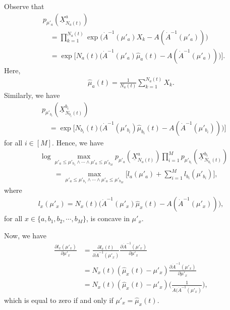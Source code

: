 \documentclass[final]{IEEEtran}
\newcommand{\nn}{\nonumber}
\begin{document}
Observe that
\begin{align}
&p_{\mu'_a}(\underline{X}_{N_a(t)}^a)\nn\\
&\quad =\prod_{k=1}^{N_a(t)} \exp\bigg(\dot{A}^{-1}(\mu'_a)X_k-A(\dot{A}^{-1}(\mu'_a) )\bigg)\\
&\quad =\exp\bigg[N_a(t)\bigg(\dot{A}^{-1}(\mu'_a)\hat{\mu}_a(t)-A(\dot{A}^{-1}(\mu'_a))\bigg)\bigg].
\end{align}
Here,
\begin{align}
\hat{\mu}_a(t)=\frac{1}{N_a(t)} \sum_{k=1}^{N_a(t)} X_k. 
\end{align}
Similarly, we have
\begin{align}
&p_{\mu'_{b_i}}(\underline{X}_{N_{b_i}(t)}^{b_i})\nn\\
&\quad =\exp\bigg[N_{b_i}(t)\bigg(\dot{A}^{-1}(\mu'_{b_i})\hat{\mu}_{b_i}(t)-A(\dot{A}^{-1}(\mu'_{b_i}))\bigg)\bigg]
\end{align} for all $i \in [M]$.
Hence, we have
\begin{align}
&\log \max_{\mu'_a\leq \mu'_{b_1} \wedge \cdots \wedge \mu'_a \leq \mu'_{b_M} }p_{\mu'_a}(\underline{X}_{N_a(t)}^a)  \prod_{i=1}^M p_{\mu'_{b_i}}(\underline{X}_{N_{b_i}(t)}^{b_i}) \nn\\
&\qquad =\max_{\mu'_a\leq \mu'_{b_1} \wedge \cdots \wedge \mu'_a \leq \mu'_{b_M} }\bigg[l_a(\mu'_a)+\sum_{i=1}^M l_{b_i}(\mu'_{b_i})\bigg],
\end{align} where
\begin{align}
l_x(\mu'_x)=N_x(t)\bigg(\dot{A}^{-1}(\mu'_x)\hat{\mu}_x(t)-A(\dot{A}^{-1}(\mu'_x))\bigg),
\end{align} for all $x \in \{a,b_1,b_2,\cdots, b_M\}$, is concave in $\mu'_x$. 

Now, we have
\begin{align}
\frac{\partial l_x(\mu'_x)}{\partial \mu'_x}&=\frac{\partial l_x(t)}{\partial \dot{A}^{-1}(\mu'_x)}\frac{\partial \dot{A}^{-1}(\mu'_x)}{\partial \mu'_x}\\
&= N_x(t)(\hat{\mu}_x(t)-\mu'_x)\frac{\partial \dot{A}^{-1}(\mu'_x)}{\partial \mu'_x}\\
&=N_x(t) (\hat{\mu}_x(t)-\mu'_x)\bigg(\frac{1}{\ddot{A}(\dot{A}^{-1}(\mu'_x)}\bigg),
\end{align} which is equal to zero if and only if $\mu'_x=\hat{\mu}_x(t)$.  
\end{document}
